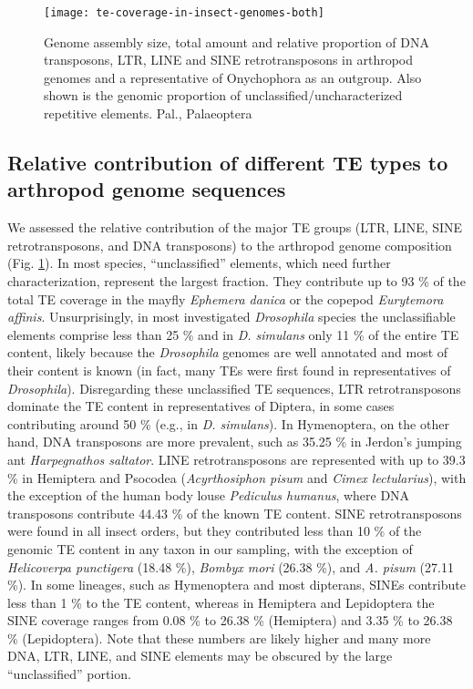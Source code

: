 \begin{figure}[h!]
\begin{center}
\texttt{[image: te-coverage-in-insect-genomes-both]}
\caption[Arthropod genome size and transposable element (TE) coverage]{{Genome assembly size,
total amount and relative proportion of DNA transposons, LTR, LINE and
SINE retrotransposons in arthropod genomes and a representative of
Onychophora as an outgroup. Also shown is the genomic proportion of
unclassified/uncharacterized repetitive elements.  Pal., Palaeoptera%
\label{fig:te-coverage}
}}
\end{center}
\end{figure}

\subsection{Relative contribution of different TE types to arthropod genome sequences}

We assessed the relative contribution of the major TE groups (LTR, LINE,
SINE retrotransposons, and DNA transposons) to the arthropod genome
composition (Fig. \ref{fig:te-coverage}). In most species,
``unclassified'' elements, which need further characterization,
represent the largest fraction. They contribute up to 93 \% of the total
TE coverage in the mayfly \emph{Ephemera danica} or the copepod
\emph{Eurytemora affinis}.  Unsurprisingly, in most investigated
\emph{Drosophila} species the unclassifiable elements comprise less than
25 \% and in \emph{D.  simulans} only 11 \% of the entire TE content,
likely because the \emph{Drosophila} genomes are well annotated and most
of their content is known (in fact, many TEs were first found in
representatives of \emph{Drosophila}). Disregarding these unclassified
TE sequences, LTR retrotransposons dominate the TE content in
representatives of Diptera, in some cases contributing around 50 \%
(e.g., in \emph{D. simulans}).  In Hymenoptera, on the other hand, DNA
transposons are more prevalent, such as 35.25 \% in Jerdon's jumping ant
\emph{Harpegnathos saltator}.  LINE retrotransposons are represented
with up to 39.3 \% in Hemiptera and Psocodea (\emph{Acyrthosiphon pisum}
and \emph{Cimex lectularius}), with the exception of the human body
louse \emph{Pediculus humanus}, where DNA transposons contribute 44.43
\% of the known TE content. SINE retrotransposons were found in all
insect orders, but they contributed less than 10 \% of the genomic TE
content in any taxon in our sampling, with the exception of
\emph{Helicoverpa punctigera} (18.48 \%), \emph{Bombyx mori} (26.38 \%),
and \emph{A. pisum} (27.11 \%). In some lineages, such as Hymenoptera
and most dipterans, SINEs contribute less than 1 \% to the TE content,
whereas in Hemiptera and Lepidoptera the SINE coverage ranges from 0.08
\% to 26.38 \% (Hemiptera) and 3.35 \% to 26.38 \% (Lepidoptera). Note
that these numbers are likely higher and many more DNA, LTR, LINE, and
SINE elements may be obscured by the large ``unclassified'' portion.


